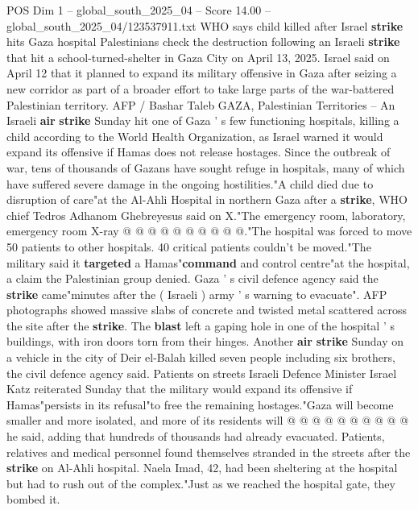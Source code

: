 \begin{textsample}{POS Dim 1 – global\_south\_2025\_04 – Score 14.00 – global\_south\_2025\_04/123537911.txt}  \label{ex:f1_pos_323}
WHO says child killed after Israel \textbf{strike} hits Gaza hospital Palestinians check the destruction following an Israeli \textbf{strike} that hit a school-turned-shelter in Gaza City on April 13, 2025.
Israel said on April 12 that it planned to expand its military offensive in Gaza after seizing a new corridor as part of a broader effort to take large parts of the war-battered Palestinian territory.
AFP / Bashar Taleb GAZA, Palestinian Territories -- An Israeli \textbf{air} \textbf{strike} Sunday hit one of Gaza ' s few functioning hospitals, killing a child according to the World Health Organization, as Israel warned it would expand its offensive if Hamas does not release hostages.
Since the outbreak of war, tens of thousands of Gazans have sought refuge in hospitals, many of which have suffered severe damage in the ongoing hostilities."A child died due to disruption of care"at the Al-Ahli Hospital in northern Gaza after a \textbf{strike}, WHO chief Tedros Adhanom Ghebreyesus said on X."The emergency room, laboratory, emergency room X-ray @ @ @ @ @ @ @ @ @ @."The hospital was forced to move 50 patients to other hospitals. 40 critical patients couldn't be moved."The military said it \textbf{targeted} a Hamas"\textbf{command} and control centre"at the hospital, a claim the Palestinian group denied.
Gaza ' s civil defence agency said the \textbf{strike} came"minutes after the ( Israeli ) army ' s warning to evacuate".
AFP photographs showed massive slabs of concrete and twisted metal scattered across the site after the \textbf{strike}.
The \textbf{blast} left a gaping hole in one of the hospital ' s buildings, with iron doors torn from their hinges.
Another \textbf{air} \textbf{strike} Sunday on a vehicle in the city of Deir el-Balah killed seven people including six brothers, the civil defence agency said.
Patients on streets Israeli Defence Minister Israel Katz reiterated Sunday that the military would expand its offensive if Hamas"persists in its refusal"to free the remaining hostages."Gaza will become smaller and more isolated, and more of its residents will @ @ @ @ @ @ @ @ @ @ he said, adding that hundreds of thousands had already evacuated.
Patients, relatives and medical personnel found themselves stranded in the streets after the \textbf{strike} on Al-Ahli hospital.
Naela Imad, 42, had been sheltering at the hospital but had to rush out of the complex."Just as we reached the hospital gate, they bombed it.

\end{textsample}
